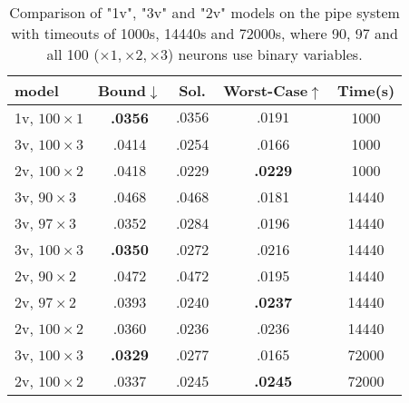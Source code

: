 	\begin{table}[h!]
	\begin{tabular}{||l||c|c|c|c||}\hline\hline
		model &        Bound$\downarrow$ &  Sol. &      Worst-Case$\uparrow$ &  Time(s) \\\hline \hline
		1v, $100 \times 1$ &     {\bf .0356} &  $.0356$ & $.0191$ &  1000 \\\hline
		3v, $100 \times 3$&     .0414 &  .0254 &  .0166 &  1000 \\\hline
		2v, $100 \times 2$&     .0418 &  .0229 &   {\bf .0229} &  1000 \\\hline \hline
		
	    3v, $90 \times 3$&     .0468 &  .0468 &  .0181 & 14440 \\\hline	
		3v, $97 \times 3$&     .0352 &  .0284 &  .0196 & 14440 \\\hline
		3v, $100 \times 3$&      {\bf .0350} &  .0272 &  .0216 & 14440 \\\hline

		2v, $90 \times 2$&     .0472 &  .0472 &  .0195 & 14440 \\\hline	
		2v, $97 \times 2$&     .0393 &  .0240 &   {\bf .0237} & 14440 \\\hline
		2v, $100 \times 2$&     .0360 &  .0236 &   .0236 & 14440 \\\hline \hline

		3v, $100 \times 3$&     {\bf .0329} &  .0277 &  .0165 & 72000 \\\hline
		2v, $100 \times 2$&     .0337 &  .0245 &  {\bf .0245} & 72000 \\\hline\hline
	\end{tabular}
	\caption{Comparison of "1v", "3v" and "2v" models on the pipe system with timeouts of 1000s, 14440s and 72000s, where 90, 97 and all 100 ($\times 1, \times 2,\times 3$) neurons use binary variables.}
	\label{table.pipe}
\end{table}




